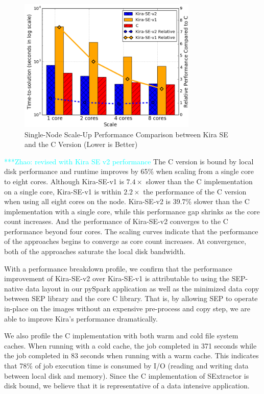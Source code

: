 \documentclass[10pt,journal,compsoc]{IEEEtran}
\newcommand{\zhaonote}[1]{{\textcolor{cyan}    { ***Zhao:      #1 }}}
\newcommand{\evannote}[1]{{\textcolor{blue}    {***Evan:      #1}}}
\newcommand{\zhaonote}[1]{}
\newcommand{\evannote}[1]{}
\begin{document}
\begin{figure}[h]
	\begin{center}
		\includegraphics[width=85mm]{pictures/scaleup}
		\caption{Single-Node Scale-Up Performance Comparison between Kira SE and the C Version (Lower is Better) 
		\label{fig:scaleup}}
  	\end{center}
\end{figure}

\zhaonote{revised with Kira SE v2 performance}
The C version is bound by local disk performance and runtime improves by 65\% when scaling from a single core
to eight cores.
Although Kira-SE-v1 is $7.4\times$ slower than the C implementation
on a single core, Kira-SE-v1 is within $2.2\times$ the performance of the C version when using all eight cores on the node.
Kira-SE-v2 is 39.7\% slower than the C implementation with a single core, while this performance gap
shrinks as the core count increases. And the performance of Kira-SE-v2 converges to the C performance beyond four cores.
The scaling curves indicate that the performance of the approaches begins to converge
as core count increases. At convergence, both of the approaches saturate the local
disk bandwidth.

With a performance breakdown profile, we confirm that the performance improvement of Kira-SE-v2 over
Kira-SE-v1 is attributable to using the SEP-native data layout in our pySpark application as well as the minimized data copy between SEP library and the core C library. That is, by allowing SEP to operate in-place on the images without an expensive pre-process and copy step, we are able to improve Kira's performance dramatically.

We also profile the C implementation with both warm and cold file system caches. When running with a
cold cache, the job completed in 371 seconds while the job completed in 83 seconds when
running with a warm cache. This indicates that 78\% of job execution time is consumed by
I/O (reading and writing data between local disk and memory). Since the C implementation of
SExtractor is disk bound, we believe that it is representative of a data intensive application. 
\end{document}
